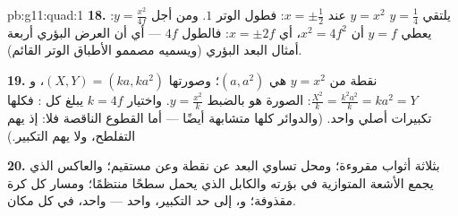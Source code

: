 \begin{solution}{pb:g11:quad:1}
\textbf{18.} يلتقي $y = \frac14$  $y = x^2$ عند $x = \pm\frac12$:
فطول الوتر $1$. ومن أجل $y = \frac{x^2}{4f}$: يعطي $y = f$ أن
$x^2 = 4f^2$، أي $x = \pm 2f$: فالطول $4f$ --- أي أن العرض البؤري
أربعة أمثال البعد البؤري (ويسميه مصممو الأطباق
الوتر القائم).

\textbf{19.} نقطة من $y = x^2$ هي $(a, a^2)$؛ وصورتها
$(X, Y) = (ka, ka^2)$، و $\frac{X^2}{k} = \frac{k^2a^2}{k} =
ka^2 = Y$:  الصورة هو بالضبط $y = \frac{x^2}{k}$.
واختيار $k = 4f$ يبلغ كل : فكلها تكبيرات
 أصلي واحد. (والدوائر كلها متشابهة أيضًا --- أما القطوع الناقصة فلا: إذ يهم التفلطح، ولا يهم التكبير.)

\textbf{20.}  بثلاثة أثواب مقروءة؛ ومحل تساوي
البعد عن نقطة وعن مستقيم؛ والعاكس
الذي يجمع الأشعة المتوازية في بؤرته والكابل الذي
يحمل سطحًا منتظمًا؛ ومسار كل كرة مقذوفة؛ و،
إلى حد التكبير،  واحد ---  واحد،
في كل مكان.
\end{solution}
